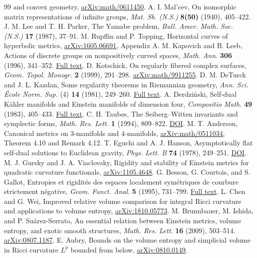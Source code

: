 \begin{thebibliography}{99}
and convex geometry,
\href{https://arxiv.org/abs/math/0611450}{arXiv:math/0611450}.
 A. I. Mal'cev, On isomorphic matrix
representations of infinite groups, \emph{Mat. Sb. (N.S.)}
\textbf{8(50)} (1940), 405--422.
 J. M. Lee and T. H. Parker, The Yamabe
problem, \emph{Bull. Amer. Math. Soc. (N.S.)} \textbf{17} (1987), 37--91.
 M. Rupflin and P. Topping,
Horizontal curves of hyperbolic metrics,
\href{https://arxiv.org/abs/1605.06691}{arXiv:1605.06691}, Appendix A.
 M. Kapovich and B. Leeb,
Actions of discrete groups on nonpositively curved spaces,
\emph{Math. Ann.} \textbf{306} (1996), 341--352.
\href{https://www.math.ucdavis.edu/~kapovich/EPR/KL_1996.pdf}{Full text}.
 D. Kotschick,
On regularly fibered complex surfaces,
\emph{Geom. Topol. Monogr.} \textbf{2} (1999), 291--298.
\href{https://arxiv.org/abs/math/9911255}{arXiv:math/9911255}.
 D. M. DeTurck and J. L. Kazdan,
Some regularity theorems in Riemannian geometry,
\emph{Ann. Sci. \'Ecole Norm. Sup.} (4) \textbf{14} (1981), 249--260.
\href{https://www.numdam.org/item/10.24033/asens.1405/}{Full text}.
 A. Derdzi\'nski,
Self-dual K\"ahler manifolds and Einstein manifolds of dimension four,
\emph{Compositio Math.} \textbf{49} (1983), 405--433.
\href{https://www.numdam.org/item/CM_1983__49_3_405_0/}{Full text}.
 C. H. Taubes,
The Seiberg--Witten invariants and symplectic forms,
\emph{Math. Res. Lett.} \textbf{1} (1994), 809--822.
\href{https://doi.org/10.4310/MRL.1994.v1.n6.a15}{DOI}.
 M. T. Anderson,
Canonical metrics on 3-manifolds and 4-manifolds,
\href{https://arxiv.org/abs/math/0511034}{arXiv:math/0511034},
Theorem 4.10 and Remark 4.12.
 T. Eguchi and A. J. Hanson,
Asymptotically flat self-dual solutions to Euclidean gravity,
\emph{Phys. Lett. B} \textbf{74} (1978), 249--251.
\href{https://doi.org/10.1016/0370-2693(78)90566-X}{DOI}.
 M. J. Gursky and J. A. Viaclovsky,
Rigidity and stability of Einstein metrics for quadratic curvature functionals,
\href{https://arxiv.org/abs/1105.4648}{arXiv:1105.4648}.
 G. Besson, G. Courtois, and S. Gallot,
Entropies et rigidit\'es des espaces localement sym\'etriques de courbure
strictement n\'egative,
\emph{Geom. Funct. Anal.} \textbf{5} (1995), 731--799.
\href{https://www.aimath.org/WWN/entropyrigidity/papers/BessonCourtoisGallot.pdf}{Full text}.
 L. Chen and G. Wei,
Improved relative volume comparison for integral Ricci curvature and
applications to volume entropy,
\href{https://arxiv.org/abs/1810.05773}{arXiv:1810.05773}.
 M. Brunnbauer, M. Ishida,
and P. Su\'arez-Serrato,
An essential relation between Einstein metrics, volume entropy,
and exotic smooth structures,
\emph{Math. Res. Lett.} \textbf{16} (2009), 503--514.
\href{https://arxiv.org/abs/0807.1187}{arXiv:0807.1187}.
 E. Aubry,
Bounds on the volume entropy and simplicial volume in Ricci curvature
$L^p$ bounded from below,
\href{https://arxiv.org/abs/0810.0149}{arXiv:0810.0149}.
\end{thebibliography}

